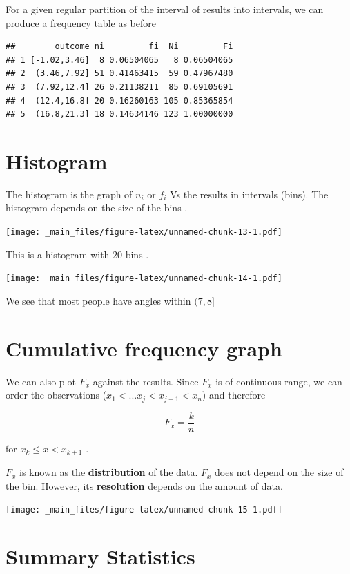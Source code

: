\documentclass[
]{book}
\begin{document}
For a given regular partition of the interval of results into intervals, we can produce a frequency table as before

\begin{verbatim}
##        outcome ni         fi  Ni         Fi
## 1 [-1.02,3.46]  8 0.06504065   8 0.06504065
## 2  (3.46,7.92] 51 0.41463415  59 0.47967480
## 3  (7.92,12.4] 26 0.21138211  85 0.69105691
## 4  (12.4,16.8] 20 0.16260163 105 0.85365854
## 5  (16.8,21.3] 18 0.14634146 123 1.00000000
\end{verbatim}

\hypertarget{histogram}{%
\section{Histogram}\label{histogram}}

The histogram is the graph of \(n_i\) or \(f_i\) Vs the results in intervals (bins). The histogram depends on the size of the bins .

\texttt{[image: \_main\_files/figure-latex/unnamed-chunk-13-1.pdf]}

\newpage

This is a histogram with 20 bins .

\texttt{[image: \_main\_files/figure-latex/unnamed-chunk-14-1.pdf]}

We see that most people have angles within \((7, 8]\)

\hypertarget{cumulative-frequency-graph-1}{%
\section{Cumulative frequency graph}\label{cumulative-frequency-graph-1}}

We can also plot \(F_x\) against the results. Since \(F_x\) is of continuous range, we can order the observations (\(x_1 <... x_j < x_{j+1} < x_n\)) and therefore

\[F_x = \frac{k}{ n}\]

for \(x_{k} \leq x < x_{k+ 1}\) .

\(F_x\) is known as the \textbf{distribution} of the data. \(F_x\) does not depend on the size of the bin. However, its \textbf{resolution} depends on the amount of data.

\texttt{[image: \_main\_files/figure-latex/unnamed-chunk-15-1.pdf]}

\hypertarget{summary-statistics}{%
\section{Summary Statistics}\label{summary-statistics}}
\end{document}
